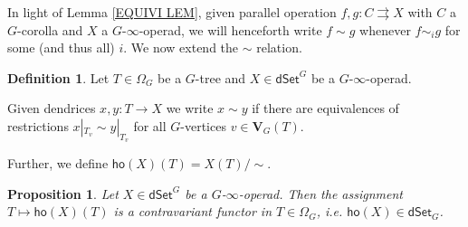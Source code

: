 \documentclass[a4paper,10pt
,draft
]{article}%
\numberwithin{equation}{section}
\numberwithin{figure}{section}
\newtheorem{proposition}[equation]{Proposition}%
\theoremstyle{definition} %
\newtheorem{definition}[equation]{Definition}%
\newcommand{\1}{\ensuremath{\mathbbm 1}}%
\begin{document}
In light of Lemma \ref{EQUIVI LEM},
given parallel operation $f,g \colon C \rightrightarrows X$ with 
$C$ a $G$-corolla and $X$ a $G$-$\infty$-operad,
we will henceforth write $f \sim g$ whenever $f \sim_i g$ for some (and thus all) $i$.
We now extend the $\sim$ relation.

\begin{definition}\label{XTENDSIM DEF}
	Let $T \in \Omega_G$ be a $G$-tree
	and $X \in \mathsf{dSet}^G$ be a 
	$G$-$\infty$-operad.
	
	Given dendrices $x,y\colon T \to X$ we write
	$x \sim y$ if there are equivalences of restrictions
	$x|_{T_v} \sim y|_{T_v}$ for all $G$-vertices
	$v \in \boldsymbol{V}_G(T)$.
	
	Further, we define $\mathsf{ho}(X)(T) = X(T)/\sim$.
\end{definition}

\begin{proposition}
Let $X \in \mathsf{dSet}^G$ be a $G$-$\infty$-operad. Then the assignment 
		$T \mapsto \mathsf{ho}(X)(T)$
		is a contravariant functor in $T \in \Omega_G$, i.e.
		$\mathsf{ho}(X)\in \mathsf{dSet}_G$.
\end{proposition}
\end{document}
